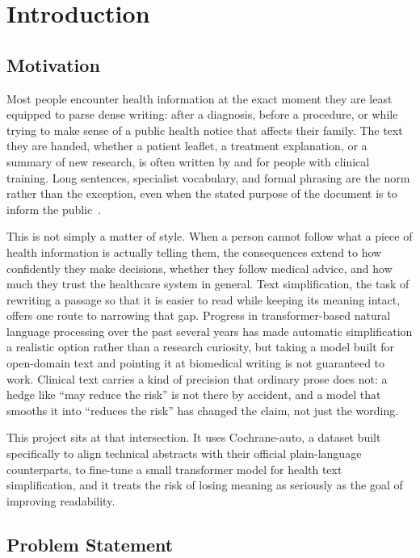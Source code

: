\chapter{Introduction}
\label{ch:introduction}

\section{Motivation}
\label{sec:motivation}

Most people encounter health information at the exact moment they are least equipped to parse dense writing: after a diagnosis, before a procedure, or while trying to make sense of a public health notice that affects their family. The text they are handed, whether a patient leaflet, a treatment explanation, or a summary of new research, is often written by and for people with clinical training. Long sentences, specialist vocabulary, and formal phrasing are the norm rather than the exception, even when the stated purpose of the document is to inform the public~\cite{hra2025plainlanguage,mrct2025plainlanguage}.

This is not simply a matter of style. When a person cannot follow what a piece of health information is actually telling them, the consequences extend to how confidently they make decisions, whether they follow medical advice, and how much they trust the healthcare system in general. Text simplification, the task of rewriting a passage so that it is easier to read while keeping its meaning intact, offers one route to narrowing that gap. Progress in transformer-based natural language processing over the past several years has made automatic simplification a realistic option rather than a research curiosity, but taking a model built for open-domain text and pointing it at biomedical writing is not guaranteed to work. Clinical text carries a kind of precision that ordinary prose does not: a hedge like ``may reduce the risk'' is not there by accident, and a model that smooths it into ``reduces the risk'' has changed the claim, not just the wording.

This project sits at that intersection. It uses Cochrane-auto, a dataset built specifically to align technical abstracts with their official plain-language counterparts, to fine-tune a small transformer model for health text simplification, and it treats the risk of losing meaning as seriously as the goal of improving readability.

\section{Problem Statement}
\label{sec:problem-statement}

